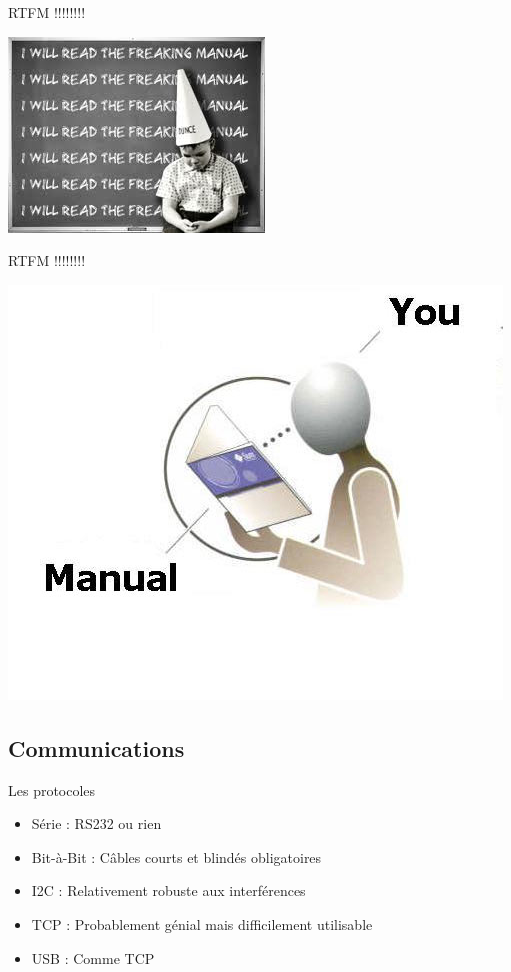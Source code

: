 \documentclass{beamer}
\begin{document}
\begin{frame}{RTFM !!!!!!!!}
	\begin{center}
		\includegraphics{rtfm03.jpg}
	\end{center}
\end{frame}
\begin{frame}{RTFM !!!!!!!!}
	\begin{center}
		\includegraphics[scale=0.5]{rtfm04.jpg}
	\end{center}
\end{frame}

\subsection{Communications}
\begin{frame}{Les protocoles}
	\begin{itemize}
		\item Série : RS232 ou rien
		\item Bit-à-Bit : Câbles courts et blindés obligatoires
		\item I2C : Relativement robuste aux interférences
		\item TCP : Probablement génial mais difficilement utilisable
		\item USB : Comme TCP
	\end{itemize}
\end{frame}
\end{document}
